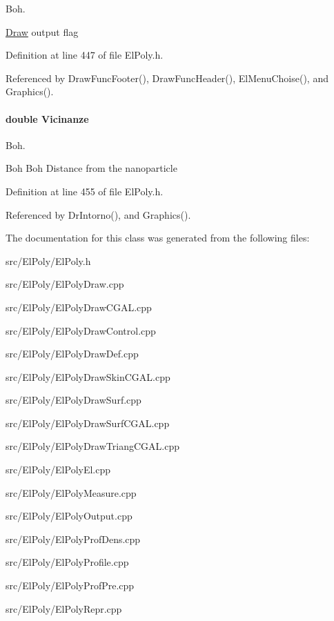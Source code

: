 \-Boh. 

\hyperlink{classDraw}{\-Draw} output flag 

\-Definition at line 447 of file \-El\-Poly.\-h.



\-Referenced by \-Draw\-Func\-Footer(), \-Draw\-Func\-Header(), \-El\-Menu\-Choise(), and \-Graphics().

\hypertarget{classElPoly_ae8d6419041af331f07d9992abef3a867}{
\paragraph[{\-Vicinanze}]{\setlength{\rightskip}{0pt plus 5cm}double {\bf \-Vicinanze}}}\label{classElPoly_ae8d6419041af331f07d9992abef3a867}


\-Boh. 

\-Boh \-Boh \-Distance from the nanoparticle 

\-Definition at line 455 of file \-El\-Poly.\-h.



\-Referenced by \-Dr\-Intorno(), and \-Graphics().



\-The documentation for this class was generated from the following files\-:\begin{DoxyCompactItemize}
\item 
src/\-El\-Poly/\-El\-Poly.\-h\item 
src/\-El\-Poly/\-El\-Poly\-Draw.\-cpp\item 
src/\-El\-Poly/\-El\-Poly\-Draw\-C\-G\-A\-L.\-cpp\item 
src/\-El\-Poly/\-El\-Poly\-Draw\-Control.\-cpp\item 
src/\-El\-Poly/\-El\-Poly\-Draw\-Def.\-cpp\item 
src/\-El\-Poly/\-El\-Poly\-Draw\-Skin\-C\-G\-A\-L.\-cpp\item 
src/\-El\-Poly/\-El\-Poly\-Draw\-Surf.\-cpp\item 
src/\-El\-Poly/\-El\-Poly\-Draw\-Surf\-C\-G\-A\-L.\-cpp\item 
src/\-El\-Poly/\-El\-Poly\-Draw\-Triang\-C\-G\-A\-L.\-cpp\item 
src/\-El\-Poly/\-El\-Poly\-El.\-cpp\item 
src/\-El\-Poly/\-El\-Poly\-Measure.\-cpp\item 
src/\-El\-Poly/\-El\-Poly\-Output.\-cpp\item 
src/\-El\-Poly/\-El\-Poly\-Prof\-Dens.\-cpp\item 
src/\-El\-Poly/\-El\-Poly\-Profile.\-cpp\item 
src/\-El\-Poly/\-El\-Poly\-Prof\-Pre.\-cpp\item 
src/\-El\-Poly/\-El\-Poly\-Repr.\-cpp\end{DoxyCompactItemize}
